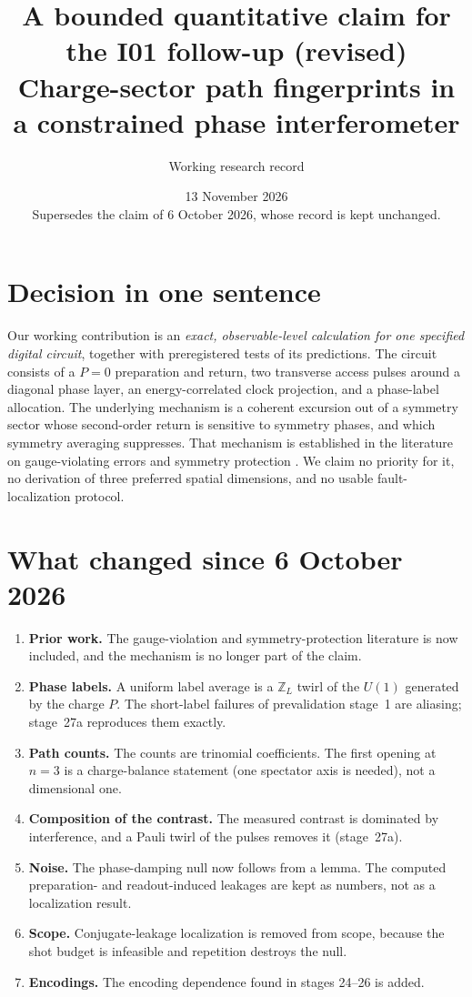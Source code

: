 \documentclass[11pt,a4paper]{article}
\title{A bounded quantitative claim for the I01 follow-up (revised)\\
\large Charge-sector path fingerprints in a constrained phase interferometer}
\author{Working research record}
\date{13 November 2026\\[2pt]\small Supersedes the claim of 6 October 2026, whose record is kept unchanged.}
\begin{document}
\maketitle
\vspace{-1.2em}

\section*{Decision in one sentence}
Our working contribution is an \emph{exact, observable-level calculation for one specified digital circuit}, together with preregistered tests of its predictions. The circuit consists of a $P=0$ preparation and return, two transverse access pulses around a diagonal phase layer, an energy-correlated clock projection, and a phase-label allocation. The underlying mechanism is a coherent excursion out of a symmetry sector whose second-order return is sensitive to symmetry phases, and which symmetry averaging suppresses. That mechanism is established in the literature on gauge-violating errors and symmetry protection \cite{halimeh2020,lamm2020,tran2021}. We claim no priority for it, no derivation of three preferred spatial dimensions, and no usable fault-localization protocol.

\section*{What changed since 6 October 2026}
\begin{enumerate}\itemsep0pt
\item \textbf{Prior work.} The gauge-violation and symmetry-protection literature is now included, and the mechanism is no longer part of the claim.
\item \textbf{Phase labels.} A uniform label average is a $\mathbb Z_L$ twirl of the $U(1)$ generated by the charge $P$. The short-label failures of prevalidation stage~1 are aliasing; stage~27a reproduces them exactly.
\item \textbf{Path counts.} The counts are trinomial coefficients. The first opening at $n=3$ is a charge-balance statement (one spectator axis is needed), not a dimensional one.
\item \textbf{Composition of the contrast.} The measured contrast is dominated by interference, and a Pauli twirl of the pulses removes it (stage~27a).
\item \textbf{Noise.} The phase-damping null now follows from a lemma. The computed preparation- and readout-induced leakages are kept as numbers, not as a localization result.
\item \textbf{Scope.} Conjugate-leakage localization is removed from scope, because the shot budget is infeasible and repetition destroys the null.
\item \textbf{Encodings.} The encoding dependence found in stages 24--26 is added.
\end{enumerate}
\end{document}
